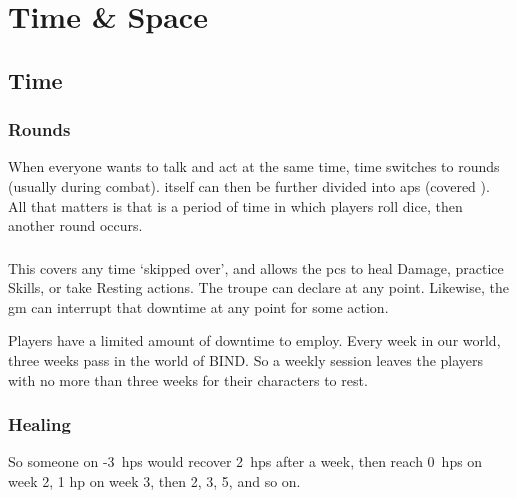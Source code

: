 \pagebreak
\section{Time \& Space}

\begin{multicols}{2}

\subsection{Time}
\label{time}

\subsubsection{Rounds}

When everyone wants to talk and act at the same time, time switches to \glspl{round} (usually during combat).
 itself can then be further divided into \glspl{ap} (covered ).
All that matters is that  is a period of time in which players roll dice, then another \gls{round} occurs.

\subsubsection{}
\label{intervals}



\subsubsection{}

This covers any time `skipped over', and allows the \glspl{pc} to heal Damage, practice Skills, or take Resting actions.
The troupe can declare  at any point.
Likewise, the \gls{gm} can interrupt that \gls{downtime} at any point for some action.

Players have a limited amount of \gls{downtime} to employ.
Every week in our world, three weeks pass in the world of BIND.
So a weekly session leaves the players with no more than three weeks for their characters to rest.

\subsubsection{Healing}
\label{healing}

So someone on -3~\glspl{hp} would recover 2~\glspl{hp} after a week, then reach 0~\glspl{hp} on week 2, 1 \gls{hp} on week 3, then 2, 3, 5, and so on.


\end{multicols}
